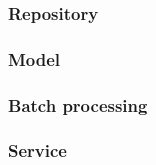 \subsubsection{Repository}


\subsubsection{Model}


\subsubsection{Batch processing}


\subsubsection{Service}

